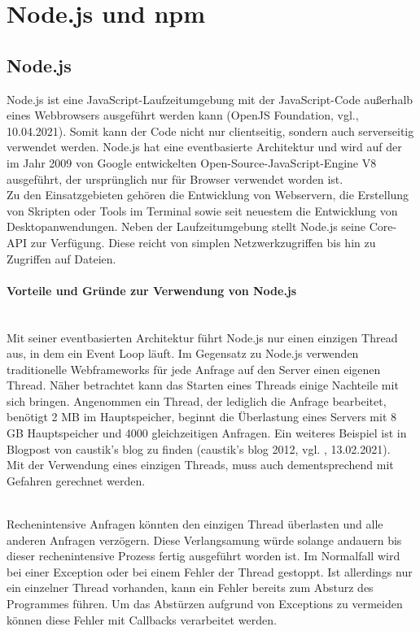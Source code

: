 \section{Node.js und npm}

\subsection{Node.js}
Node.js ist eine JavaScript-Laufzeitumgebung mit der JavaScript-Code außerhalb eines Webbrowsers ausgeführt werden kann (OpenJS Foundation, vgl.\cite{nodejs_2021}, 10.04.2021). Somit kann der Code nicht nur clientseitig, sondern auch serverseitig verwendet werden. Node.js hat eine eventbasierte Architektur und wird auf der im Jahr 2009 von Google entwickelten Open-Source-JavaScript-Engine V8 ausgeführt, der ursprünglich nur für Browser verwendet worden ist.\\
Zu den Einsatzgebieten gehören die Entwicklung von Webservern, die Erstellung von Skripten oder Tools im Terminal sowie seit neuestem die Entwicklung von Desktopanwendungen. Neben der Laufzeitumgebung stellt Node.js seine Core-API zur Verfügung. Diese reicht von simplen Netzwerkzugriffen bis hin zu Zugriffen auf Dateien.

\paragraph{Vorteile und Gründe zur Verwendung von Node.js}
\mbox{}\\
Mit seiner eventbasierten Architektur führt Node.js nur einen einzigen Thread aus, in dem ein Event Loop läuft. Im Gegensatz zu Node.js verwenden traditionelle Webframeworks für jede Anfrage auf den Server einen eigenen Thread. Näher betrachtet kann das Starten eines Threads einige Nachteile mit sich bringen. Angenommen ein Thread, der lediglich die Anfrage bearbeitet, benötigt 2 MB im Hauptspeicher, beginnt die Überlastung eines Servers mit 8 GB Hauptspeicher und 4000 gleichzeitigen Anfragen. Ein weiteres Beispiel ist in Blogpost von caustik's blog zu finden (caustik's blog 2012, vgl. \cite{nodejs_blogpost_2012}, 13.02.2021).\\
Mit der Verwendung eines einzigen Threads, muss auch dementsprechend mit Gefahren gerechnet werden.

\mbox{}\\
Rechenintensive Anfragen könnten den einzigen Thread überlasten und alle anderen Anfragen verzögern. Diese Verlangsamung würde solange andauern bis dieser rechenintensive Prozess fertig ausgeführt worden ist. Im Normalfall wird bei einer Exception oder bei einem Fehler der Thread gestoppt. Ist allerdings nur ein einzelner Thread vorhanden, kann ein Fehler bereits zum Absturz des Programmes führen. Um das Abstürzen aufgrund von Exceptions zu vermeiden können diese Fehler mit Callbacks verarbeitet werden.

